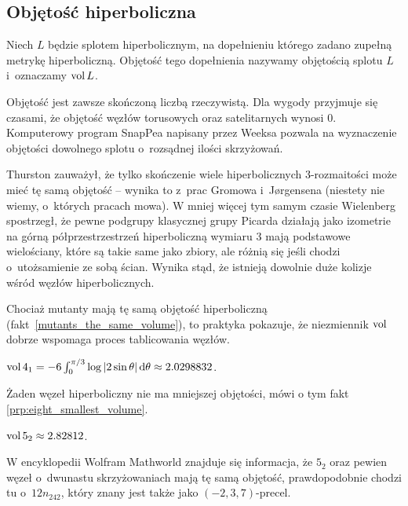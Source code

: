 
\subsection{Objętość hiperboliczna}

%
\begin{definition}[objętość]
    Niech $L$ będzie splotem hiperbolicznym, na dopełnieniu którego zadano zupełną metrykę hiperboliczną.
    Objętość tego dopełnienia nazywamy objętością splotu $L$ i~oznaczamy $\operatorname{vol} L$.
\end{definition}

Objętość jest zawsze skończoną liczbą rzeczywistą.
Dla wygody przyjmuje się czasami, że objętość węzłów torusowych oraz satelitarnych wynosi $0$.
Komputerowy program SnapPea napisany przez Weeksa pozwala na wyznaczenie objętości dowolnego splotu o~rozsądnej ilości skrzyżowań.

Thurston \cite[s. 365]{thurston1982} zauważył, że tylko skończenie wiele hiperbolicznych 3-rozmaitości może mieć tę samą objętość -- wynika to z~prac Gromowa i~Jørgensena (niestety nie wiemy, o~których pracach mowa).
%
W mniej więcej tym samym czasie Wielenberg \cite{wielenberg1981} spostrzegł, że pewne podgrupy klasycznej grupy Picarda działają jako izometrie na górną półprzestrzestrzeń hiperboliczną wymiaru 3 mają podstawowe wielościany, które są takie same jako zbiory, ale różnią się jeśli chodzi o~utożsamienie ze sobą ścian.
%
%
Wynika stąd, że istnieją dowolnie duże kolizje wśród węzłów hiperbolicznych.

Chociaż mutanty mają tę samą objętość hiperboliczną (fakt~\ref{mutants_the_same_volume}), to praktyka pokazuje, że niezmiennik $\operatorname{vol}$ dobrze wspomaga proces tablicowania węzłów.
%

\begin{example}
    $\operatorname{vol} 4_1 = -6 \int_{0}^{\pi/3} \log |2\sin \theta| \,\mathrm{d}\theta \approx 2.0298832$.
\end{example}

Żaden węzeł hiperboliczny nie ma mniejszej objętości, mówi o tym fakt \ref{prp:eight_smallest_volume}.

\begin{example}
    $\operatorname{vol} 5_2 \approx 2.82812$.
\end{example}

W encyklopedii Wolfram Mathworld znajduje się informacja, że $5_2$ oraz pewien węzeł o~dwunastu skrzyżowaniach mają tę samą objętość, prawdopodobnie chodzi tu o~$12n_{242}$, który znany jest także jako $(-2, 3, 7)$-precel.
%
%

